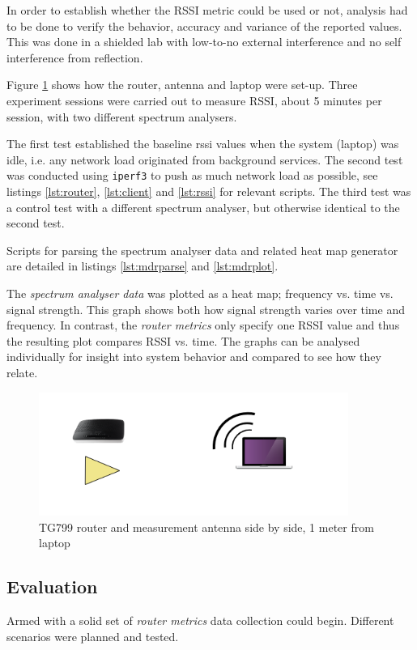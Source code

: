 In order to establish whether the RSSI metric could be used or not, analysis had
to be done to verify the behavior, accuracy and variance of the reported values.
This was done in a shielded lab with low-to-no external interference and no self
interference from reflection.

Figure \ref{fig:rssi_setup} shows how the router, antenna and laptop were
set-up. Three experiment sessions were carried out to measure RSSI, about 5
minutes per session, with two different spectrum analysers.

The first test established the baseline rssi values when the system (laptop) was
idle, i.e. any network load originated from background services. The second test
was conducted using \texttt{iperf3} to push as much network load as possible,
see listings \ref{lst:router}, \ref{lst:client} and \ref{lst:rssi} for relevant
scripts. The third test was a control test with a different spectrum analyser,
but otherwise identical to the second test.

Scripts for parsing the spectrum analyser data and related heat map generator
are detailed in listings \ref{lst:mdrparse} and \ref{lst:mdrplot}.

The \emph{spectrum analyser data} was plotted as a heat map; frequency vs. time
vs. signal strength. This graph shows both how signal strength varies over time
and frequency. In contrast, the \emph{router metrics} only specify one RSSI
value and thus the resulting plot compares RSSI vs. time. The graphs can be
analysed individually for insight into system behavior and compared to see how
they relate.

\begin{figure}
\center
\includegraphics[width=0.9\textwidth]{images/rssi_setup.png}
\caption{TG799 router and measurement antenna side by side, 1 meter from laptop}
\label{fig:rssi_setup}
\end{figure}

\subsection{Evaluation}

Armed with a solid set of \emph{router metrics} data collection could begin.
Different scenarios were planned and tested.
